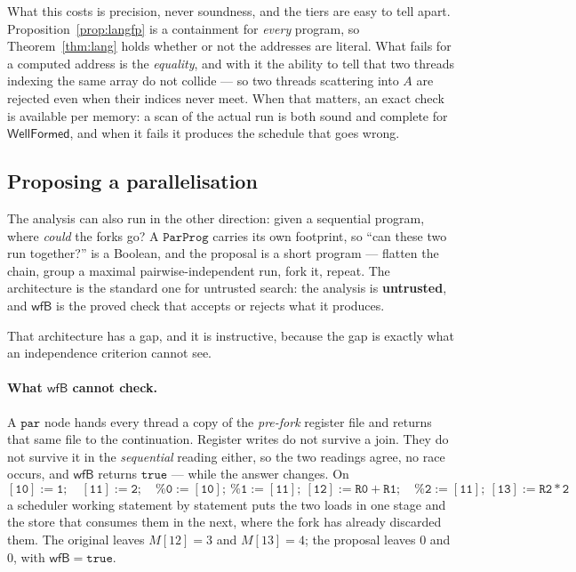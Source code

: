 \documentclass[11pt,a4paper]{article}
\theoremstyle{definition}
\theoremstyle{plain}
\theoremstyle{remark}
\newcommand{\wf}{\mathsf{WellFormed}}
\begin{document}
What this costs is precision, never soundness, and the tiers are easy to tell apart.
Proposition~\ref{prop:langfp} is a containment for \emph{every} program, so
Theorem~\ref{thm:lang} holds whether or not the addresses are literal. What fails for a
computed address is the \emph{equality}, and with it the ability to tell that two threads
indexing the same array do not collide --- so two threads scattering into $A$ are rejected
even when their indices never meet. When that matters, an exact check is available per
memory: a scan of the actual run is both sound and complete for $\wf$, and when it fails it
produces the schedule that goes wrong.

\subsection{Proposing a parallelisation}\label{sec:lang:autopar}

The analysis can also run in the other direction: given a sequential program, where
\emph{could} the forks go? A $\texttt{ParProg}$ carries its own footprint, so ``can these two
run together?'' is a Boolean, and the proposal is a short program --- flatten the chain,
group a maximal pairwise-independent run, fork it, repeat. The architecture is the standard
one for untrusted search: the analysis is \textbf{untrusted}, and $\mathsf{wfB}$ is the
proved check that accepts or rejects what it produces.

That architecture has a gap, and it is instructive, because the gap is exactly what an
independence criterion cannot see.

\paragraph{What $\mathsf{wfB}$ cannot check.}
A $\texttt{par}$ node hands every thread a copy of the \emph{pre-fork} register file and
returns that same file to the continuation. Register writes do not survive a join. They do
not survive it in the \emph{sequential} reading either, so the two readings agree, no race
occurs, and $\mathsf{wfB}$ returns $\mathtt{true}$ --- while the answer changes. On
\[
  \mathtt{[10]\!:=\!1};\quad \mathtt{[11]\!:=\!2};\quad
  \mathtt{\%0\!:=\![10];\ \%1\!:=\![11];\ [12]\!:=\!R0{+}R1};\quad
  \mathtt{\%2\!:=\![11];\ [13]\!:=\!R2{*}2}
\]
a scheduler working statement by statement puts the two loads in one stage and the store that
consumes them in the next, where the fork has already discarded them. The original leaves
$M[12] = 3$ and $M[13] = 4$; the proposal leaves $0$ and $0$, with
$\mathsf{wfB} = \mathtt{true}$.
\end{document}
